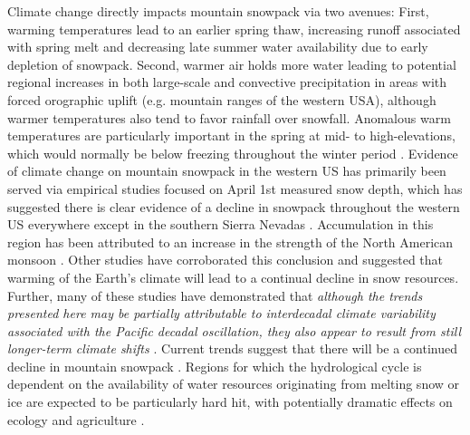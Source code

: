 \documentclass[11pt]{article}
\begin{document}
Climate change directly impacts mountain snowpack via two avenues: First, warming temperatures lead to an earlier spring thaw, increasing runoff associated with spring melt and decreasing late summer water availability due to early depletion of snowpack. Second, warmer air holds more water leading to potential regional increases in both large-scale and convective precipitation in areas with forced orographic uplift (e.g. mountain ranges of the western USA), although warmer temperatures also tend to favor rainfall over snowfall. Anomalous warm temperatures are particularly important in the spring at mid- to high-elevations, which would normally be below freezing throughout the winter period \citep{cayan1996interannual,stewart2009changes}. Evidence of climate change on mountain snowpack in the western US has primarily been served via empirical studies focused on April 1st measured snow depth, which has suggested there is clear evidence of a decline in snowpack throughout the western US everywhere except in the southern Sierra Nevadas \citep{mote_declining_2005, bales2006mountain}. Accumulation in this region has been attributed to an increase in the strength of the North American monsoon \citep{dyer2006spatial}. Other studies have corroborated this conclusion \citep{dettinger1995large,mote_declining_2005,knowles2006trends} and suggested that warming of the Earth's climate will lead to a continual decline in snow resources. Further, many of these studies have demonstrated that \textit{although the trends presented here may be partially attributable to interdecadal climate variability associated with the Pacific decadal oscillation, they also appear to result from still longer-term climate shifts} \citep{knowles2006trends}. Current trends suggest that there will be a continued decline in mountain snowpack \citep{stewart2009changes}. Regions for which the hydrological cycle is dependent on the availability of water resources originating from melting snow or ice are expected to be particularly hard hit, with potentially dramatic effects on ecology and agriculture \citep{barnett2005potential}.
\end{document}
